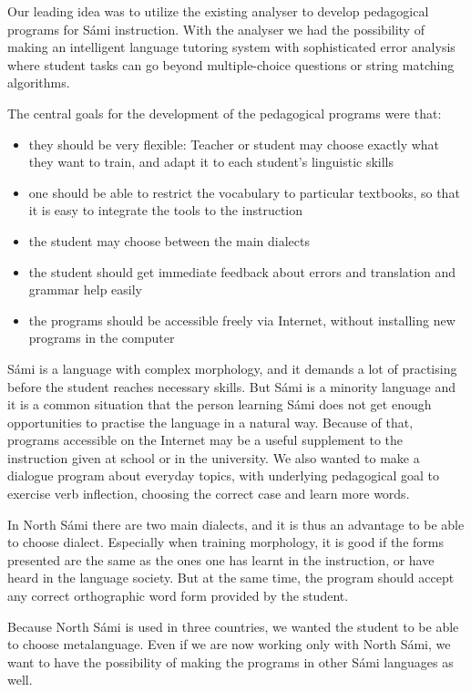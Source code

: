 \documentclass[11pt]{article}
\begin{document}
Our leading idea was to utilize the existing analyser to develop pedagogical programs for Sámi instruction.  With the analyser we had the possibility of making an intelligent language tutoring system with sophisticated error analysis where student tasks can go beyond multiple-choice questions or string matching algorithms. 

The central goals for the development of the pedagogical programs were that:

\begin{itemize}
\item they should be very flexible: Teacher or student may choose exactly what they want to train, and adapt it to each student's linguistic skills 
\item one should be able to restrict the vocabulary to particular textbooks, so that it is easy to integrate the tools to the instruction
\item the student may choose between the main dialects 
\item the student should get immediate feedback about errors and translation and grammar help easily
\item the programs should be accessible freely via Internet, without installing new programs in the computer
\end{itemize}

Sámi is a language with complex morphology, and it demands a lot of practising before the student reaches necessary skills. But Sámi is a minority language and it is a common situation that the person learning Sámi does not get enough opportunities to practise the language in a natural way. Because of that, programs accessible on the Internet may be a useful supplement to the instruction given at school or in the university. We also wanted to make a dialogue program about everyday topics, with underlying pedagogical goal to exercise verb inflection, choosing the correct case and learn more words. 

In North Sámi there are two main dialects, and it is thus an advantage to be able to choose dialect. Especially when training morphology, it is good if the forms presented are the same as the ones one has learnt in the instruction, or have heard in the language society. But at the same time, the program should accept any correct orthographic word form provided by the student.

Because North Sámi is used in three countries, we wanted the student to be able to choose metalanguage. Even if we are now working only with North Sámi, we want to have the possibility of making the programs in other Sámi languages as well.
\end{document}
